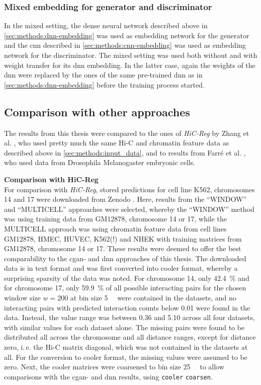 \subsubsection{Mixed embedding for generator and discriminator} \label{sec:methods:mixed-embedding}
In the mixed setting, the dense neural network described above in \cref{sec:methods:dnn-embedding} was used as  
embedding network for the generator and the \acrshort{cnn} described in \cref{sec:methods:cnn-embedding} was used as embedding
network for the discriminator.
The mixed setting was used both without and with weight transfer for its \acrshort{dnn} embedding.
In the latter case, again the weights of the \acrshort{dnn} were replaced by the ones of the same pre-trained \acrshort{dnn} as in \cref{sec:methods:dnn-embedding}
 before the training process started.
\clearpage
 
\subsection{Comparison with other approaches} \label{sec:methods:comparison}
The results from this thesis were compared to the ones of \emph{HiC-Reg} by Zhang et al. \cite{Zhang2019}, 
who used pretty much the same Hi-C and chromatin feature data
as described above in \cref{sec:methods:input_data}, 
and to results from Farr\'e et al. \cite{Farre2018a}, who used data from Drosophila Melanogaster embryonic cells.

\textbf{Comparison with HiC-Reg}\\
For comparison with \emph{HiC-Reg}, stored predictions for cell line K562, chromosomes 14 and 17 were downloaded from Zenodo \cite{ShiluZhang2019,ShiluZhang2019a}.
Here, results from the ``WINDOW'' and ``MULTICELL'' approaches were selected, whereby the ``WINDOW'' method was using training data from GM12878, chromosome 14 or 17, 
while the MULTICELL approach was using chromatin feature data from cell lines GM12878, HMEC, HUVEC, K562(!) and NHEK with training matrices from GM12878, chromosome 14 or 17.
These results were deemed to offer the best comparability to the \acrshort{cgan}- and \acrshort{dnn} approaches of this thesis.
The downloaded data is in text format and was first converted into cooler format, whereby a surprising sparsity of the data was noted.
For chromosome 14, only \SI{42.4}{\percent} and for chromosome 17, only \SI{59.9}{\percent} of all possible interacting pairs 
for the chosen window size $w=200$ at bin size \SI{5}{\kilo\bp} were contained in the datasets, 
and no interacting pairs with predicted interaction counts below 0.01 were found in the data. 
Instead, the value range was between 0.36 and 5.10 across all four datasets, with similar values for each dataset alone.
The missing pairs were found to be distributed all across the chromosome and all distance ranges, except for distance zero, i.\,e. the Hi-C matrix diagonal, which was not contained in the datasets at all.
For the conversion to cooler format, the missing values were assumed to be zero.
Next, the cooler matrices were coarsened to bin size \SI{25}{\kilo\bp} to allow comparisons with the \acrshort{cgan}- and \acrshort{dnn} results, using \texttt{cooler} \texttt{coarsen}.

